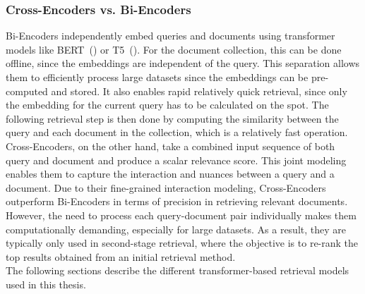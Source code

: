 \subsubsection{Cross-Encoders vs. Bi-Encoders}\label{sec:cross-encoders}

Bi-Encoders independently embed queries and documents using transformer models like BERT~(\cite{devlin:2018}) or T5~(\cite{roberts:2019}).
For the document collection, this can be done offline, since the embeddings are independent of the query.
This separation allows them to efficiently process large datasets since the embeddings can be pre-computed and stored.
It also enables rapid relatively quick retrieval, since only the embedding for the current query has to be calculated on the spot.
The following retrieval step is then done by computing the similarity between the query and each document in the collection, which is a relatively fast operation.
\\
Cross-Encoders, on the other hand, take a combined input sequence of both query and document and produce a scalar relevance score.
This joint modeling enables them to capture the interaction and nuances between a query and a document.
Due to their fine-grained interaction modeling, Cross-Encoders outperform Bi-Encoders in terms of precision in retrieving relevant documents.
However, the need to process each query-document pair individually makes them computationally demanding, especially for large datasets.
As a result, they are typically only used in second-stage retrieval, where the objective is to re-rank the top results obtained from an initial retrieval method.
\\
The following sections describe the different transformer-based retrieval models used in this thesis.
